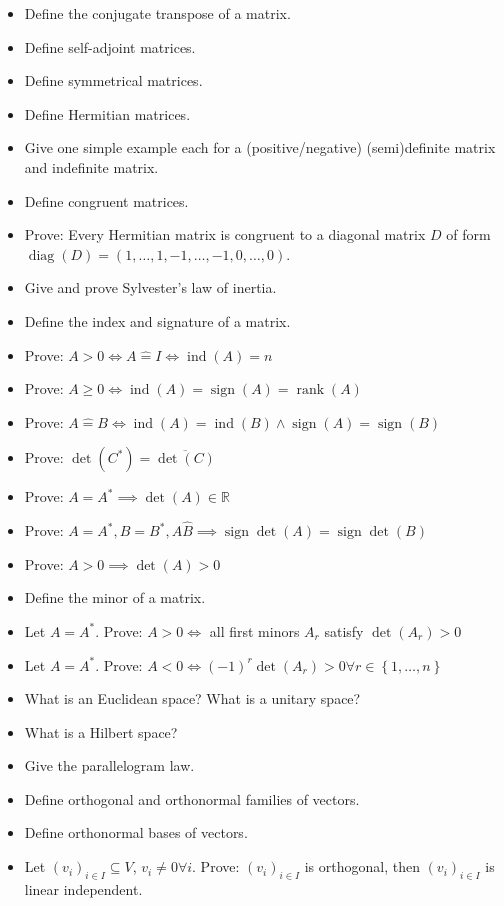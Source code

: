 \documentclass[a4paper]{article}
\newcommand{\set}[1]{\left\{#1\right\}}
\DeclareMathOperator{\sign}{sign}
\begin{document}
\begin{itemize}
  \item Define the conjugate transpose of a matrix.
  \item Define self-adjoint matrices.
  \item Define symmetrical matrices.
  \item Define Hermitian matrices.
  \item Give one simple example each for a (positive/negative) (semi)definite matrix and indefinite matrix.
  \item Define congruent matrices.
  \item Prove: Every Hermitian matrix is congruent to a diagonal matrix $D$ of form $\operatorname{diag}(D) = (1, \dots, 1, -1, \dots, -1, 0, \dots, 0)$.
  \item Give and prove Sylvester's law of inertia.
  \item Define the index and signature of a matrix.
  \item Prove: $A > 0 \iff A \hat={} I \iff \operatorname{ind}(A) = n$
  \item Prove: $A \geq 0 \iff \operatorname{ind}(A) = \operatorname{sign}(A) = \operatorname{rank}(A)$
  \item Prove: $A \hat={} B \iff \operatorname{ind}(A) = \operatorname{ind}(B) \land \operatorname{sign}(A) = \operatorname{sign}(B)$
  \item Prove: $\det(C^*) = \overline{\det(C)}$
  \item Prove: $A = A^* \implies \det(A) \in \mathbb R$
  \item Prove: $A = A^*, B = B^*, A \hat B \implies \sign{\det(A)} = \sign{\det(B)}$
  \item Prove: $A > 0 \implies \det(A) > 0$
  \item Define the minor of a matrix.
  \item Let $A = A^*$. Prove: $A > 0 \iff$ all first minors $A_r$ satisfy $\det(A_r) > 0$
  \item Let $A = A^*$. Prove: $A < 0 \iff (-1)^r \det(A_r) > 0 \forall r \in \set{1, \dots, n}$
  \item What is an Euclidean space? What is a unitary space?
  \item What is a Hilbert space?
  \item Give the parallelogram law.
  \item Define orthogonal and orthonormal families of vectors.
  \item Define orthonormal bases of vectors.
  \item Let $(v_i)_{i \in I} \subseteq V$, $v_i \neq 0 \forall i$. Prove: $(v_i)_{i \in I}$ is orthogonal, then $(v_i)_{i \in I}$ is linear independent.

\end{itemize}
\end{document}

